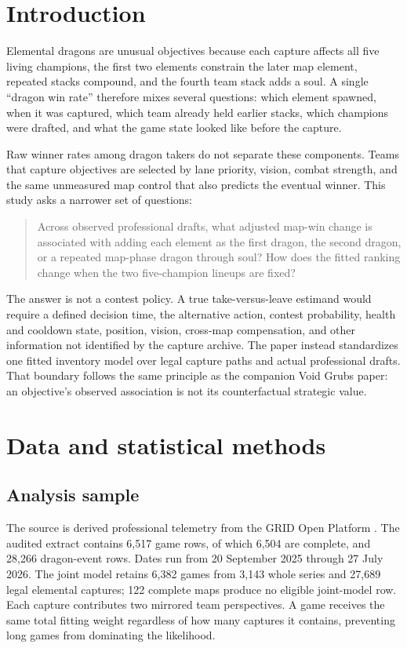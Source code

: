 \documentclass[10pt,letterpaper]{article}
\begin{document}
\section{Introduction}
Elemental dragons are unusual objectives because each capture affects all five living champions, the first two elements constrain the later map element, repeated stacks compound, and the fourth team stack adds a soul. A single ``dragon win rate'' therefore mixes several questions: which element spawned, when it was captured, which team already held earlier stacks, which champions were drafted, and what the game state looked like before the capture.

Raw winner rates among dragon takers do not separate these components. Teams that capture objectives are selected by lane priority, vision, combat strength, and the same unmeasured map control that also predicts the eventual winner. This study asks a narrower set of questions:
\begin{quote}
\small
Across observed professional drafts, what adjusted map-win change is associated with adding each element as the first dragon, the second dragon, or a repeated map-phase dragon through soul? How does the fitted ranking change when the two five-champion lineups are fixed?
\end{quote}

The answer is not a contest policy. A true take-versus-leave estimand would require a defined decision time, the alternative action, contest probability, health and cooldown state, position, vision, cross-map compensation, and other information not identified by the capture archive. The paper instead standardizes one fitted inventory model over legal capture paths and actual professional drafts. That boundary follows the same principle as the companion Void Grubs paper: an objective's observed association is not its counterfactual strategic value.

\clearpage
\section{Data and statistical methods}

\subsection{Analysis sample}
The source is derived professional telemetry from the GRID Open Platform \cite{grid}. The audited extract contains 6,517 game rows, of which 6,504 are complete, and 28,266 dragon-event rows. Dates run from 20 September 2025 through 27 July 2026. The joint model retains 6,382 games from 3,143 whole series and 27,689 legal elemental captures; 122 complete maps produce no eligible joint-model row. Each capture contributes two mirrored team perspectives. A game receives the same total fitting weight regardless of how many captures it contains, preventing long games from dominating the likelihood.
\end{document}
